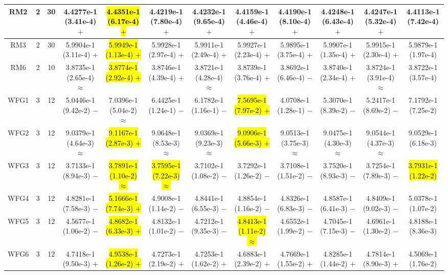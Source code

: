 \documentclass[journal]{IEEEtran}
\begin{document}
\begin{table*}[htbp]
\begin{tabular}{cccccccccccc}
\hline
\multirow{1}{*}{RM2}&2&30&4.4277e-1 (3.41e-4) $+$&\hl{4.4351e-1 (6.17e-4) $+$}&4.4219e-1 (7.80e-4) $+$&4.4232e-1 (9.65e-4) $+$&4.4159e-1 (4.46e-4) $+$&4.4190e-1 (8.10e-4) $+$&4.4248e-1 (6.43e-4) $+$&4.4247e-1 (5.32e-4) $+$&4.4113e-1 (7.42e-4)\\
\hline
\multirow{1}{*}{RM3}&2&30&5.9904e-1 (3.11e-4) $+$&\hl{5.9949e-1 (1.13e-4) $+$}&5.9928e-1 (2.97e-4) $+$&5.9911e-1 (2.49e-4) $+$&5.9927e-1 (2.23e-4) $+$&5.9895e-1 (3.75e-4) $+$&5.9907e-1 (1.35e-4) $+$&5.9915e-1 (2.30e-4) $+$&5.9879e-1 (1.97e-4)\\
\hline
\multirow{1}{*}{RM6}&2&10&3.8735e-1 (2.65e-4) $\approx$&\hl{3.8774e-1 (2.92e-4) $+$}&3.8746e-1 (4.39e-4) $+$&3.8721e-1 (4.28e-4) $\approx$&3.8739e-1 (3.76e-4) $+$&3.8692e-1 (6.46e-4) $-$&3.8740e-1 (2.34e-4) $+$&3.8724e-1 (3.91e-4) $\approx$&3.8722e-1 (3.57e-4)\\
\hline
\multirow{1}{*}{WFG1}&3&12&5.0446e-1 (9.42e-2) $-$&7.0396e-1 (5.04e-2) $\approx$&6.4425e-1 (1.24e-1) $-$&6.1782e-1 (1.16e-1) $-$&\hl{7.5695e-1 (7.97e-2) $+$}&4.0708e-1 (1.28e-1) $-$&5.3070e-1 (8.39e-2) $-$&5.2417e-1 (8.69e-2) $-$&7.1792e-1 (7.25e-2)\\
\hline
\multirow{1}{*}{WFG2}&3&12&9.0379e-1 (4.64e-3) $\approx$&\hl{9.1167e-1 (2.87e-3) $+$}&9.0648e-1 (8.53e-3) $\approx$&9.0369e-1 (9.23e-3) $\approx$&\hl{9.0906e-1 (5.66e-3) $+$}&9.0513e-1 (3.75e-3) $\approx$&9.0475e-1 (4.30e-3) $\approx$&9.0544e-1 (4.37e-3) $\approx$&9.0529e-1 (6.18e-3)\\
\hline
\multirow{1}{*}{WFG3}&3&12&3.7133e-1 (8.94e-3) $-$&\hl{3.7891e-1 (1.10e-2) $\approx$}&\hl{3.7595e-1 (7.22e-3) $\approx$}&3.7102e-1 (1.08e-2) $-$&3.7292e-1 (1.26e-2) $-$&3.7108e-1 (1.51e-2) $-$&3.7520e-1 (8.93e-3) $-$&3.7254e-1 (7.89e-3) $-$&\hl{3.7931e-1 (1.22e-2)}\\
\hline
\multirow{1}{*}{WFG4}&3&12&4.8281e-1 (7.58e-3) $-$&\hl{5.1666e-1 (7.74e-3) $+$}&4.9008e-1 (1.14e-2) $-$&4.8441e-1 (6.55e-3) $-$&4.8854e-1 (1.16e-2) $-$&4.8326e-1 (6.83e-3) $-$&4.8587e-1 (6.41e-3) $-$&4.8409e-1 (9.02e-3) $-$&5.0378e-1 (1.07e-2)\\
\hline
\multirow{1}{*}{WFG5}&3&12&4.5677e-1 (1.06e-2) $-$&\hl{4.8682e-1 (6.33e-3) $+$}&4.8132e-1 (1.01e-2) $-$&4.7212e-1 (9.35e-3) $-$&\hl{4.8413e-1 (1.11e-2) $\approx$}&4.6552e-1 (1.99e-2) $-$&4.7045e-1 (7.15e-3) $-$&4.6961e-1 (1.30e-2) $-$&4.8188e-1 (8.36e-3)\\
\hline
\multirow{1}{*}{WFG6}&3&12&4.7418e-1 (9.50e-3) $+$&\hl{4.9538e-1 (1.26e-2) $+$}&4.7273e-1 (2.19e-2) $+$&4.7253e-1 (1.62e-2) $+$&4.6883e-1 (2.39e-2) $+$&4.7669e-1 (1.55e-2) $+$&4.8285e-1 (1.44e-2) $+$&4.7814e-1 (8.90e-3) $+$&4.5069e-1 (1.76e-2)\\

\end{tabular}
\end{table*}
\end{document}
